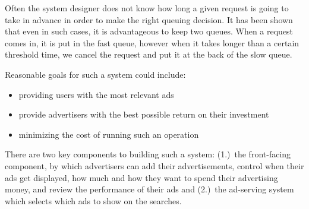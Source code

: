 Often the system designer does not know how long a given request is
going to take in advance in order to make the right queuing decision. It has
been shown that even in such cases, it is advantageous to keep two
queues. When a request comes in, it is put in the fast queue, however
when it takes longer than a certain threshold time, we cancel the
request and put it at the back of the slow queue.


Reasonable goals for such a system could include:
\itemsep 1pt
\begin{itemize}
\item providing users with the most relevant ads
\item provide advertisers with the best possible return on their investment
\item minimizing the cost of running such an operation
\end{itemize}

There are two key components to building such a system: 
(1.)~the front-facing component, by which advertisers can add
their advertisements, control when their ads get displayed, how much
and how they want to spend their advertising money, and review
the performance of their ads and (2.)~the ad-serving system
which selects which ads to show on the searches.

